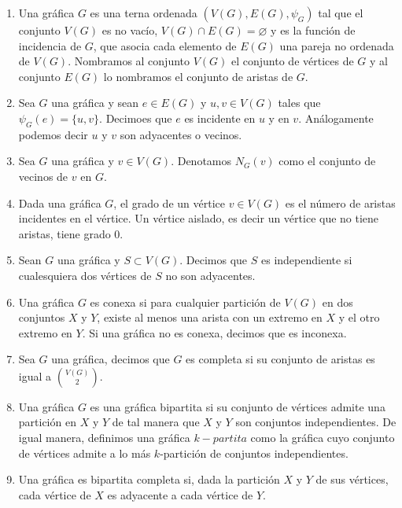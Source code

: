 \begin{definicion}
    \begin{enumerate}
        \item Una gr\'afica $G$ es una terna ordenada $(V(G), E(G),
        \psi_G)$ tal que el conjunto $V(G)$ es no vac\'i{}o, $V(G) \cap
        E(G) = \varnothing$ y es la funci\'on de incidencia de $G$, que
        asocia cada elemento de $E(G)$ una pareja no ordenada de $V(G)$.
        Nombramos al conjunto $V(G)$ el conjunto de v\'ertices de $G$ y al
        conjunto $E(G)$ lo nombramos el conjunto de aristas de $G$.
        \item Sea $G$ una gr\'afica y sean $e \in E(G)$ y $u,v \in V(G)$
        tales que $\psi_G(e)= \{u, v\}$. Decimoes que $e$ es incidente en
        $u$ y en $v$. An\'alogamente podemos decir $u$ y $v$ son adyacentes
        o vecinos.
        \item Sea $G$ una gr\'afica y $v\in V(G)$. Denotamos $N_G(v)$ como
        el conjunto de vecinos de $v$ en $G$.
        \item Dada una gr\'afica $G$, el grado de un v\'ertice $v \in V(G)$
        es el n\'umero de aristas incidentes en el v\'ertice. Un v\'ertice
        aislado, es decir un v\'ertice que no tiene aristas, tiene grado 0.
        \item Sean $G$ una gr\'afica y $S \subset V(G)$. Decimos que $S$ es
        independiente si cualesquiera dos v\'ertices de $S$ no son adyacentes.
        \item Una gr\'afica $G$ es conexa si para cualquier partici\'on de
        $V(G)$ en dos conjuntos $X$ y $Y$, existe al menos una arista con un
        extremo en $X$ y el otro extremo en $Y$. Si una gr\'afica no es
        conexa, decimos que es inconexa.
        \item Sea $G$ una gr\'afica, decimos que $G$ es completa si su
        conjunto de aristas es igual a $\binom{V(G)}{2}$.
        \item Una gr\'afica $G$ es una gr\'afica bipartita si su conjunto de
        v\'ertices admite una partici\'on en $X$ y $Y$ de tal manera que $X$
        y $Y$ son conjuntos independientes. De igual manera, definimos una
        gr\'afica $k-\textit{partita}$ como la gr\'afica cuyo conjunto de
        v\'ertices admite a lo m\'as $k$-partici\'on de conjuntos
        independientes.
        \item Una gr\'afica es bipartita completa si, dada la partici\'on
        $X$ y $Y$ de sus v\'ertices, cada v\'ertice de $X$ es adyacente a
        cada v\'ertice de $Y$. 
        

\end{enumerate}
\end{definicion}
